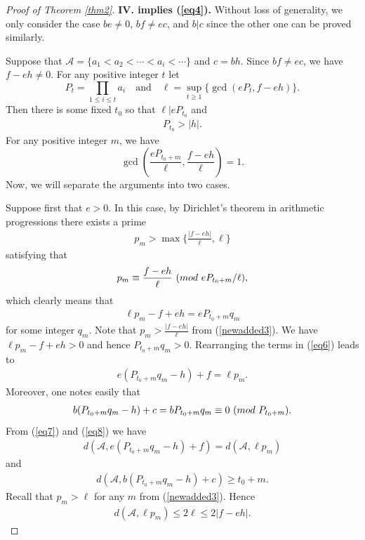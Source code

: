 \documentclass[10pt,a4paper]{amsart}
\def\pmod #1{\ ({\rm{mod}}\ #1)}
\begin{document}
\begin{proof}[Proof of Theorem \ref{thm2}]
{\bf IV. implies (\ref{eq4}).} Without loss of generality, we only consider the case $be \neq 0$, $bf\neq ec$, and $b|c$ since the other one can be proved similarly.

Suppose that $\mathcal{A}=\{a_1<a_2<\cdots<a_i<\cdots\}$ and $c=bh$. Since $bf\neq ec$, we have $f-eh\neq 0$. For any positive integer $t$ let
$$
P_t=\prod_{1\le i\le t}a_i \quad \text{and} \quad \ell=\sup_{t\ge 1}\big\{\gcd(eP_t,f-eh)\big\}.
$$
Then there is some fixed $t_0$ so that $\ell|eP_{t_0}$ and
\begin{align}\label{newadded2}
P_{t_0}>|h|. 
\end{align}
For any positive integer $m$, we  have 
$$
\gcd\left(\frac{eP_{t_0+m}}{\ell},\frac{f-eh}{\ell}\right)=1.
$$
Now, we will separate the arguments into two cases. 

Suppose first that $e>0$.  
In this case, by Dirichlet's theorem in arithmetic progressions there exists a prime 
\begin{align}\label{newadded3}
p_m>\max\Big\{\frac{|f-eh|}{\ell},\ell\Big\}
\end{align}
satisfying that
\begin{align}\label{eq5}
p_m\equiv \frac{f-eh}{\ell} \pmod{eP_{t_0+m}/\ell},
\end{align}
which clearly means that
\begin{align}\label{eq6}
\ell p_m-f+eh=eP_{t_0+m}q_m
\end{align}
for some integer $q_m$. Note that $p_m>\frac{|f-eh|}{\ell}$ from (\ref{newadded3}). We have $\ell p_m-f+eh>0$ and hence $P_{t_0+m}q_m>0$.
Rearranging the terms in (\ref{eq6}) leads to
\begin{align}\label{eq7}
e(P_{t_0+m}q_m-h)+f=\ell p_m.
\end{align}
Moreover, one notes easily that
\begin{align}\label{eq8}
b(P_{t_0+m}q_m-h)+c=bP_{t_0+m}q_m\equiv 0\pmod{P_{t_0+m}}.
\end{align}
From (\ref{eq7}) and (\ref{eq8}) we have
\begin{align}\label{eq9}
d(\mathcal{A},e(P_{t_0+m}q_m-h)+f)=d(\mathcal{A},\ell p_m)
\end{align}
and
\begin{align}\label{eq10}
d(\mathcal{A},b(P_{t_0+m}q_m-h)+c)\ge t_0+m.
\end{align}
Recall that $p_m>\ell$ for any $m$ from (\ref{newadded3}). Hence 
\begin{align}\label{eq11}
d(\mathcal{A},\ell p_m)\le 2\ell\le 2|f-eh|.
\end{align}

\end{proof}
\end{document}
